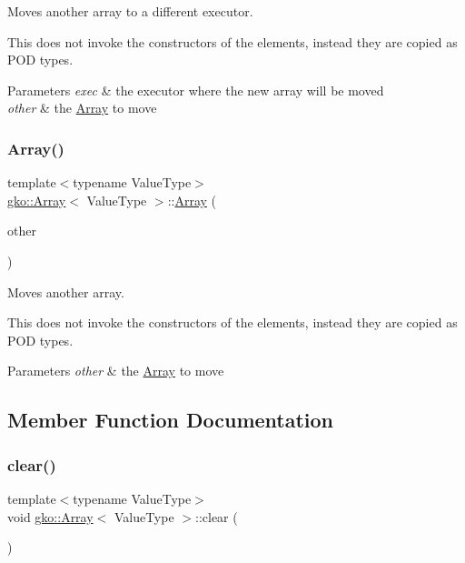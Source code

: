 Moves another array to a different executor. 

This does not invoke the constructors of the elements, instead they are copied as P\+OD types.


\begin{DoxyParams}{Parameters}
{\em exec} & the executor where the new array will be moved \\
\hline
{\em other} & the \hyperlink{classgko_1_1Array}{Array} to move \\
\hline
\end{DoxyParams}
\mbox{\label{classgko_1_1Array_a29da5ccbf776b7c85dbda0e8b4f20647}} 
\subsubsection{\texorpdfstring{Array()}{Array()}\hspace{0.1cm}{\footnotesize\ttfamily [11/11]}}
{\footnotesize\ttfamily template$<$typename Value\+Type$>$ \\
\hyperlink{classgko_1_1Array}{gko\+::\+Array}$<$ Value\+Type $>$\+::\hyperlink{classgko_1_1Array}{Array} (\begin{DoxyParamCaption}\item[{\hyperlink{classgko_1_1Array}{Array}$<$ Value\+Type $>$ \&\&}]{other }\end{DoxyParamCaption})}



Moves another array. 

This does not invoke the constructors of the elements, instead they are copied as P\+OD types.


\begin{DoxyParams}{Parameters}
{\em other} & the \hyperlink{classgko_1_1Array}{Array} to move \\
\hline
\end{DoxyParams}


\subsection{Member Function Documentation}
\mbox{\label{classgko_1_1Array_a64f7e9f19c4e8cff8adb402da70476c3}} 
\subsubsection{\texorpdfstring{clear()}{clear()}}
{\footnotesize\ttfamily template$<$typename Value\+Type$>$ \\
void \hyperlink{classgko_1_1Array}{gko\+::\+Array}$<$ Value\+Type $>$\+::clear (\begin{DoxyParamCaption}{ }\end{DoxyParamCaption})\hspace{0.3cm}{\ttfamily [noexcept]}}



